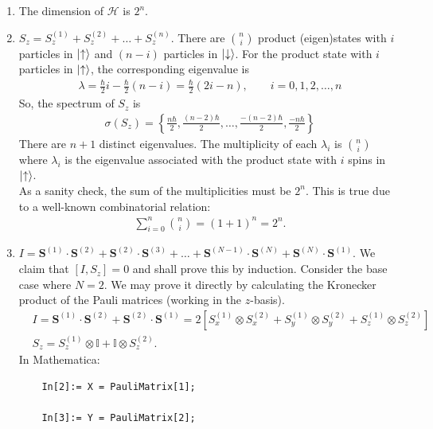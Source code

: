 \documentclass{article}
\theoremstyle{definition}
\newcommand{\ham}{\mathcal{H}}
\newcommand{\f}[2]{\frac{#1}{#2}}
\newcommand{\lp}{\left(}
\newcommand{\rp}{\right)}
\newcommand{\lb}{\left[}
\newcommand{\rb}{\right]}
\newcommand{\lc}{\left\{}
\newcommand{\rc}{\right\}}
\begin{document}
\begin{enumerate}[label=(\alph*)]
	\item The dimension of $\ham$ is $2^n$.
	
	\item $S_z = S_z^{(1)} + S_z^{(2)} + \dots + S_z^{(n)}$. There are ${n\choose i}$ product (eigen)states with $i$ particles in $\ket{\uparrow}$ and $(n-i)$ particles in $\ket{\downarrow}$. For the product state with $i$ particles in $\ket{\uparrow}$, the corresponding eigenvalue is 
	\begin{align*}
	\lambda = \f{\hbar}{2}i - \f{\hbar}{2}(n-i) = \f{\hbar}{2}\lp 2i-n \rp,\quad\quad i = 0,1,2,\dots,n
	\end{align*}
	So, the spectrum of $S_z$ is 
	\begin{align*}
	\sigma(S_z) = \lc \f{n\hbar}{2}, \f{(n-2)\hbar}{2},\dots, \f{-(n-2)\hbar}{2}, \f{-n\hbar}{2}   \rc
	\end{align*}
	There are $n+1$ distinct eigenvalues. The multiplicity of each $\lambda_i$ is ${n\choose{i}}$ where $\lambda_i$ is the eigenvalue associated with the product state with $i$ spins in $\ket{\uparrow}$. \\
	
	As a sanity check, the sum of the multiplicities must be $2^n$. This is true due to a well-known combinatorial relation:
	\begin{align*}
	\sum_{i=0}^n {n\choose{i}} = (1+1)^n = 2^n.
	\end{align*}
	
	\item $I = \mathbf{S}^{(1)}\cdot \mathbf{S}^{(2)}+ \mathbf{S}^{(2)}\cdot \mathbf{S}^{(3)} + \dots + \mathbf{S}^{(N-1)}\cdot \mathbf{S}^{(N)}+ \mathbf{S}^{(N)}\cdot \mathbf{S}^{(1)}$. We claim that $[I,S_z] = 0$ and shall prove this by induction. Consider the base case where $N=2$. We may prove it directly by calculating the Kronecker product of the Pauli matrices (working in the $z$-basis).
	\begin{align*}
	&I = \mathbf{S}^{(1)} \cdot \mathbf{S}^{(2)} + \mathbf{S}^{(2)}\cdot \mathbf{S}^{(1)} = 2\lb S_x^{(1)}\otimes S_x^{(2)} + S_y^{(1)} \otimes S_y^{(2)} + S_z^{(1)}\otimes S_z^{(2)}  \rb\\
	&S_z = S_z^{(1)} \otimes \mathbb{I} + \mathbb{I}\otimes S_z^{(2)}.
	\end{align*}
	In Mathematica:
	\begin{lstlisting}
	In[2]:= X = PauliMatrix[1];
	
	In[3]:= Y = PauliMatrix[2];
	

\end{lstlisting}
\end{enumerate}
\end{document}
